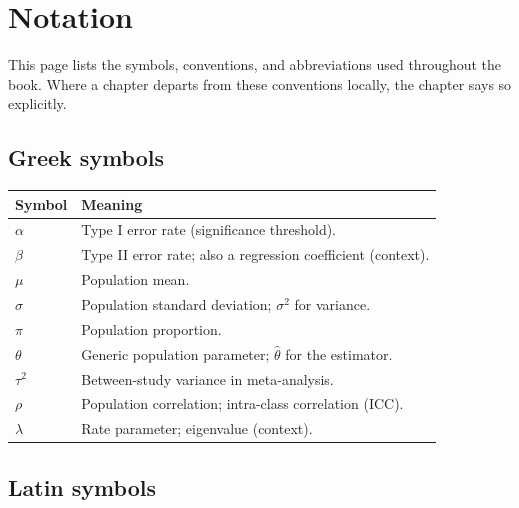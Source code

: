 \documentclass[
]{article}
\author{}
\date{\vspace{-2.5em}}
\newcounter{none} %
\begin{document}
\section*{Notation}\label{notation}

This page lists the symbols, conventions, and abbreviations used
throughout the book. Where a chapter departs from these conventions
locally, the chapter says so explicitly.

\subsection*{Greek symbols}\label{greek-symbols}

{\def\LTcaptype{none} %
\begin{longtable}[]{@{}
  >{\raggedright\arraybackslash}p{}
  >{\raggedright\arraybackslash}p{}@{}}
\toprule\noalign{}
\begin{minipage}[b]{\linewidth}\raggedright
Symbol
\end{minipage} & \begin{minipage}[b]{\linewidth}\raggedright
Meaning
\end{minipage} \\
\midrule\noalign{}
\endhead
\bottomrule\noalign{}
\endlastfoot
\(\alpha\) & Type I error rate (significance threshold). \\
\(\beta\) & Type II error rate; also a regression coefficient
(context). \\
\(\mu\) & Population mean. \\
\(\sigma\) & Population standard deviation; \(\sigma^2\) for
variance. \\
\(\pi\) & Population proportion. \\
\(\theta\) & Generic population parameter; \(\hat{\theta}\) for the
estimator. \\
\(\tau^2\) & Between-study variance in meta-analysis. \\
\(\rho\) & Population correlation; intra-class correlation (ICC). \\
\(\lambda\) & Rate parameter; eigenvalue (context). \\
\end{longtable}
}

\subsection*{Latin symbols}\label{latin-symbols}
\end{document}
